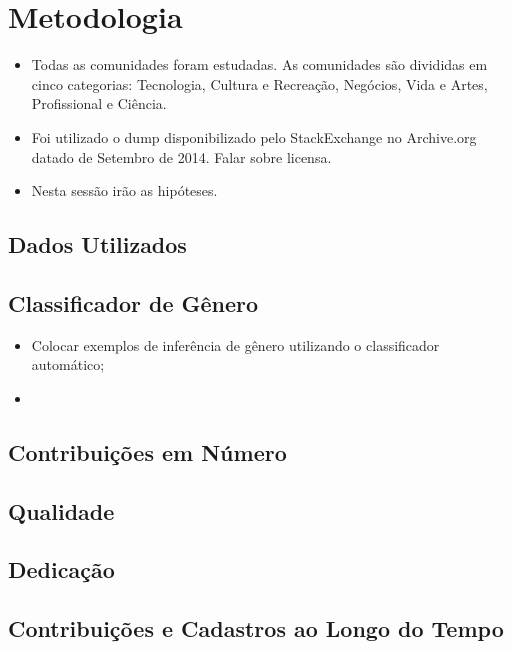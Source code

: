 \chapter{Metodologia}

\begin{itemize}
	\item Todas as comunidades foram estudadas. As comunidades são divididas em cinco categorias: Tecnologia, Cultura e Recreação, Negócios, Vida e Artes, Profissional e Ciência.
	\item Foi utilizado o dump disponibilizado pelo StackExchange no Archive.org datado de Setembro de 2014. Falar sobre licensa.
	\item Nesta sessão irão as hipóteses.
\end{itemize}

\section{Dados Utilizados} %
\label{sub:dados_utilizados}


\section{Classificador de Gênero} %
\label{sub:classificador_de_g_nero}
\begin{itemize}
	\item Colocar exemplos de inferência de gênero utilizando o classificador automático;
	\item
\end{itemize}


\section{Contribuições em Número} %
\label{sub:contribui_es_em_numero}


\section{Qualidade} %
\label{sub:qualidade}


\section{Dedicação} %
\label{sub:dedica_o}


\section{Contribuições e Cadastros ao Longo do Tempo} %
\label{sub:contribui_es_e_cadastros_ao_longo_do_tempo}


